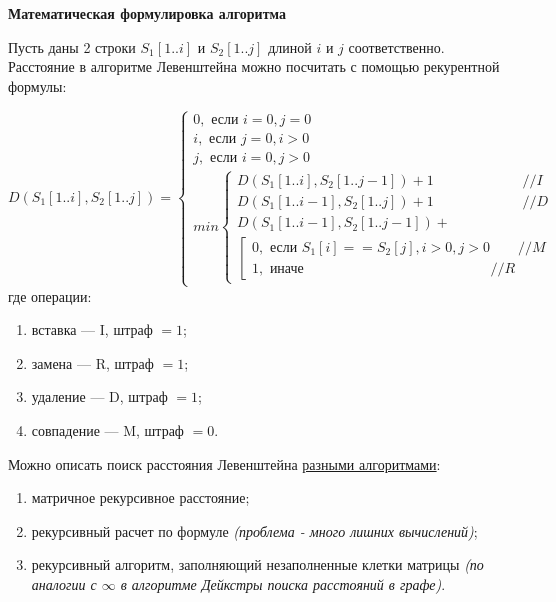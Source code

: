 \documentclass[a4paper,12pt]{article}
\begin{document}
\textbf{Математическая формулировка алгоритма}

Пусть даны 2 строки $S_1[1..i]$ и $S_2[1..j]$ длиной $i$ и $j$ соответственно. Расстояние в алгоритме Левенштейна можно посчитать с помощью рекурентной формулы:

\begin{equation*}
D(S_1[1..i],S_2[1..j]) =
\begin{cases}
	0,\text{ если }i=0,j=0
	\\
	i,\text{ если }j=0, i>0
	\\
	j,\text{ если }i=0, j>0
	\\
	min
	\begin{cases}
		D(S_1[1..i],S_2[1..j-1])+1\qquad\qquad\qquad\textit{	//I}
		\\
		D(S_1[1..i-1],S_2[1..j])+1\qquad\qquad\qquad\textit{    //D}
		\\
		D(S_1[1..i-1],S_2[1..j-1])+
		\\
		\left[
		\begin{gathered}
			0,\text{ если }S_1[i]==S_2[j],i>0,j>0\qquad\textit{//M}
			\\
			1,\text{ иначе}\qquad\qquad\qquad\qquad\qquad\qquad\quad\textit{     //R}
		\end{gathered}
		\right.
	\end{cases}
\end{cases}
\end{equation*}
где операции:
\begin{enumerate}
	\item вставка — I, штраф $=1$;
	\item замена — R, штраф $=1$;
	\item удаление — D, штраф $=1$;
	\item совпадение — M, штраф $=0$.
\end{enumerate}

\vspace{\baselineskip}

Можно описать поиск расстояния Левенштейна \underline{разными алгоритмами}:

\begin{enumerate}
	\item матричное рекурсивное расстояние;
	\item рекурсивный расчет по формуле \textit{(проблема - много лишних вычислений)};
	\item рекурсивный алгоритм, заполняющий незаполненные клетки матрицы \textit{(по аналогии с $\infty$ в алгоритме Дейкстры поиска расстояний в графе)}.
\end{enumerate}
\end{document}
